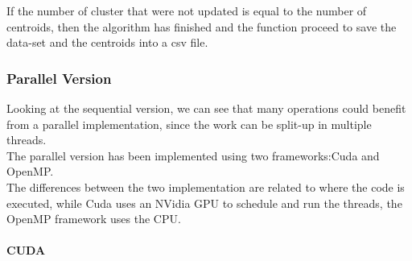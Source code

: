 \documentclass[10pt,twocolumn,letterpaper]{article}
\newcommand{\nlparagraph}[1]{\paragraph{#1}\mbox{}\\}
\begin{document}
If the number of cluster that were not updated is equal to the number of centroids, then the algorithm has finished and the function
proceed to save the data-set and the centroids into a csv file.

\subsubsection{Parallel Version}
Looking at the sequential version, we can see that many operations could benefit from a parallel implementation, since the work can be 
split-up in multiple threads.\\
The parallel version has been implemented using two frameworks:Cuda and OpenMP.\\
The differences between the two implementation are related to where the code is executed, while Cuda uses an NVidia GPU to 
schedule and run the threads, the OpenMP framework uses the CPU.\newpage
\nlparagraph{CUDA}
\end{document}
